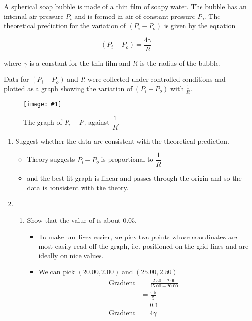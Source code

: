 \documentclass[a4paper,12pt]{article}
\newcommand{\img}[4]{\begin{center}
  \begin{figure}[H]
    \centering
    \texttt{[image: \#1]}
    \caption{#3}
    \label{fig:#4}
  \end{figure}
\end{center}}
\begin{document}
A spherical soap bubble is made of a thin film of soapy water. The bubble has an internal air pressure \( P_i \) and is formed in air of constant pressure \( P_o \). The theoretical prediction for the variation of \( (P_i - P_o) \) is given by the equation

\[
  (P_i - P_o) = \frac{4\gamma}{R}
\]

where \( \gamma \) is a constant for the thin film and \( R \) is the radius of the bubble.

Data for \( (P_i - P_o) \) and \( R \) were collected under controlled conditions and plotted as a graph showing the variation of \( (P_i - P_o) \) with \( \frac{1}{R} \).

\img{ex/7.png}{0.7}{The graph of $P_i - P_o$ against $\dfrac{1}{R}$.}{7}

\begin{enumerate}[label=(\alph*)]
  \item Suggest whether the data are consistent with the theoretical prediction.
        \begin{itemize}
          \item Theory suggests $P_i - P_o$ is proportional to $\dfrac{1}{R}$
          \item and the best fit graph is linear and passes through the origin and so the data is consistent with the theory.
        \end{itemize}
  \item \begin{enumerate}[label=(\roman*)]
          \item Show that the value of is about 0.03.
                \begin{itemize}
                  \item To make our lives easier, we pick two points whose coordinates are most easily read off the graph, i.e. positioned on the grid lines and are ideally on nice values.
                  \item We can pick $(20.00, 2.00)$ and $(25.00, 2.50)$
                        \begin{align*}
                          \text{Gradient} & = \frac{2.50 - 2.00}{25.00 - 20.00} \\
                                          & = \frac{0.5}{5}                     \\
                                          & = 0.1                               \\
                          \text{Gradient} & = 4\gamma                           \\

\end{align*}
\end{itemize}
\end{enumerate}
\end{enumerate}
\end{document}
